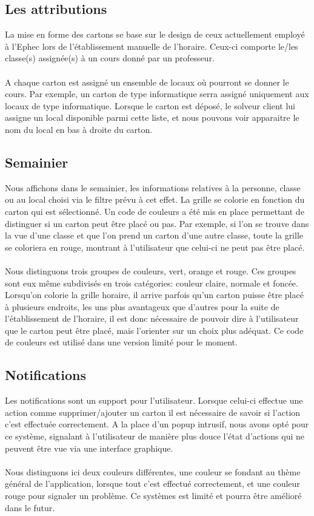 \subsection{Les attributions}
La mise en forme des cartons se base sur le design de ceux actuellement employé à l'Ephec lors de l'établissement manuelle de l'horaire. Ceux-ci comporte le/les classe(s) assignée(s) à un cours donné par un professeur.\\
\\
A chaque carton est assigné un ensemble de locaux où pourront se donner le cours. Par exemple, un carton de type informatique serra assigné uniquement aux locaux de type informatique. Lorsque le carton est déposé, le solveur client lui assigne un local disponible parmi cette liste, et nous pouvons voir apparaitre le nom du local en bas à droite du carton.
\subsection{Semainier}
Nous affichons dans le semainier, les informations relatives à la personne, classe ou au local choisi via le filtre prévu à cet effet. La grille se colorie en fonction du carton qui est sélectionné. Un code de couleurs a été mis en place permettant de distinguer si un carton peut être placé ou pas. Par exemple, si l'on se trouve dans la vue d'une classe et que l'on prend un carton d'une autre classe, toute la grille se coloriera en rouge, montrant à l'utilisateur que celui-ci ne peut pas être placé.\\
\\
Nous distinguons trois groupes de couleurs, vert, orange et rouge. Ces groupes sont eux même subdivisés en trois catégories: couleur claire, normale et foncée. Lorsqu'on colorie la grille horaire, il arrive parfois qu'un carton puisse être placé à plusieurs endroits, les uns plus avantageux que d'autres pour la suite de l'établissement de l'horaire, il est donc nécessaire de pouvoir dire à l'utilisateur que le carton peut être placé, mais l'orienter sur un choix plus adéquat. Ce code de couleurs est utilisé dans une version limité pour le moment.
\subsection{Notifications}
Les notifications sont un support pour l'utilisateur. Lorsque celui-ci effectue une action comme supprimer/ajouter un carton il est nécessaire de savoir si l'action c'est effectuée correctement. A la place d'un popup intrusif, nous avons opté pour ce système, signalant à l'utilisateur de manière plus douce l'état d'actions qui ne peuvent être vue via une interface graphique.\\
\\
Nous distinguons ici deux couleurs différentes, une couleur se fondant au thème général de l'application, lorsque tout c'est effectué correctement, et une couleur rouge pour signaler un problème. Ce systèmes est limité et pourra être amélioré dans le futur.
